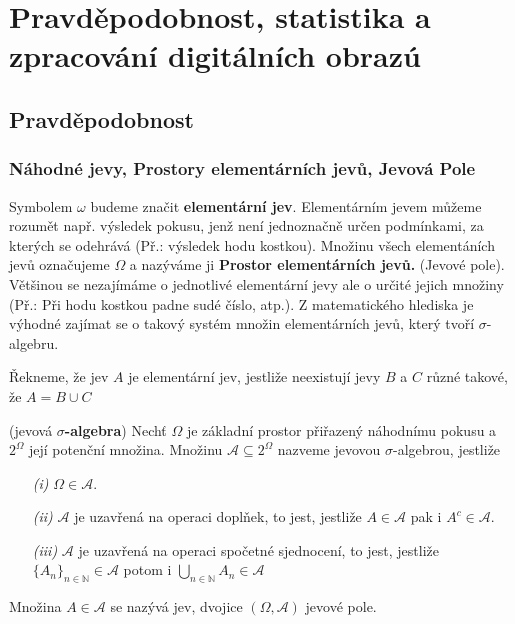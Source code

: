 
\chapter{Pravděpodobnost, statistika a zpracování digitálních obrazú}
\section{Pravděpodobnost}
\subsection{Náhodné jevy, Prostory elementárních jevů, Jevová Pole}
Symbolem $\omega$ budeme značit \textbf{elementární jev}. Elementárním jevem můžeme rozumět např. výsledek pokusu, jenž není jednoznačně určen podmínkami, za kterých se odehrává (Př.: výsledek hodu kostkou). Množinu všech elementáních jevů označujeme $\Omega$ a nazýváme ji \textbf{Prostor elementárních jevů.} (Jevové pole). Většinou se nezajímáme o jednotlivé elementární jevy ale o určité jejich množiny (Př.: Při hodu kostkou padne sudé číslo, atp.). Z matematického hlediska  je výhodné zajímat se o takový systém množin elementárních jevů, který tvoří $\sigma$-algebru.

\begin{definition}
Řekneme, že jev $A$ je elementární jev, jestliže neexistují jevy $B$ a $C$ různé takové, že $A=B\cup C$
\end{definition}

\begin{definition}\label{SihmaAlgebra}(jevová \textbf{$\sigma$-algebra})
Nechť $ \Omega $ je základní prostor přiřazený náhodnímu pokusu a $ 2^{\Omega} $ její potenční množina. Množinu $\mathcal{A} \subseteq 2^{\Omega} $ nazveme jevovou $\sigma$-algebrou, jestliže
\begin{itemize}
\item[\textit{(i)}] $ \Omega \in \mathcal{A} $.
\item[\textit{(ii)}] $\mathcal{A}$ je uzavřená na operaci doplňek, to jest, jestliže $A \in \mathcal{A}$ pak i $ A^{c} \in \mathcal{A} $.
\item[\textit{(iii)}] $\mathcal{A}$ je uzavřená na operaci spočetné sjednocení, to jest, jestliže $ \lbrace A_{n} \rbrace_{n \in \mathbb{N}} \in \mathcal{A}$ potom i $ \bigcup_{n \in \mathbb{N}}A_{n} \in \mathcal{A} $
\end{itemize}
Množina $A\in \mathcal{A} $ se nazývá jev, dvojice $(\Omega,\mathcal{A})$ jevové pole.
\end{definition}

